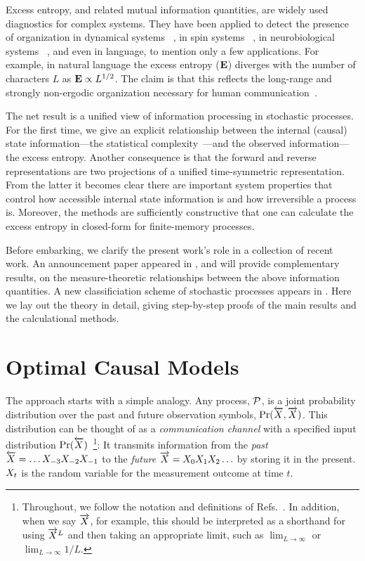 Excess entropy, and related mutual information quantities, are widely used
diagnostics for complex systems. They have been applied to detect the
presence of organization in dynamical systems~%
\cite{Fras90b,Casd91a,Spro03a,Kant06a}, in spin systems~%
\cite{Arno96,Crut97a,Feld98b}, in neurobiological systems~%
\cite{Tono94a,Bial00a},
and even in language, to mention only a few applications. For example, in
natural language the excess entropy (${\bf E}$) diverges with the number of
characters $L$ as ${\bf E} \propto L^{1/2}$. The claim is that this reflects the
long-range and strongly non-ergodic organization necessary for human
communication~\cite{Ebel94c,Debo08a}.

The net result is a unified view of information processing in
stochastic processes. For the first time, we give an explicit
relationship between the internal (causal) state information---the statistical
complexity~\cite{Crut88a}---and the observed information---the excess entropy.
Another consequence is that the forward and reverse representations are two
projections of a unified time-symmetric representation. From the latter it
becomes clear there are important system properties that control how accessible
internal state information is and how irreversible a process is. Moreover, the
methods are sufficiently constructive that one can calculate the excess
entropy in closed-form for finite-memory processes.

Before embarking, we clarify the present work's role in a collection of 
recent work. An announcement paper appeared in , and 
 will provide complementary results, on the measure-theoretic 
relationships between the above information quantities. A new classificiation
scheme of stochastic processes appears in . Here we lay out
the theory in detail, giving step-by-step proofs of the main results and the
calculational methods.

\section{Optimal Causal Models}

The approach starts with a simple analogy. Any process, $\mathcal{P}$, is a joint
probability distribution over the past and future observation symbols, 
$\Pr(\overleftarrow {{X}},\overrightarrow{{X}})$. 
This distribution can be thought of as a 
\emph{communication channel} with a specified input distribution
$\Pr(\overleftarrow {{X}})$~\footnote{Throughout, we follow the notation and definitions 
of Refs.~\cite{Cove06a,Crut98d}. In addition, when we say
$\protect\overrightarrow{{X}}$, for example, this should be interpreted
as a shorthand for using $\protect\overrightarrow{{X}}^L$ and then
taking an appropriate limit,
such as $\lim_{L \rightarrow \infty}$ or $\lim_{L \rightarrow \infty} 1/L$.}:
It transmits information from the \emph{past}
$\overleftarrow {{X}} = \ldots {X}_{-3} {X}_{-2} {X}_{-1}$ to the
\emph{future} $\overrightarrow{{X}} = {X}_0 {X}_1 {X}_2 \ldots$
by storing it in the present. ${X}_t$ is the random variable for
the measurement outcome at time $t$. 

